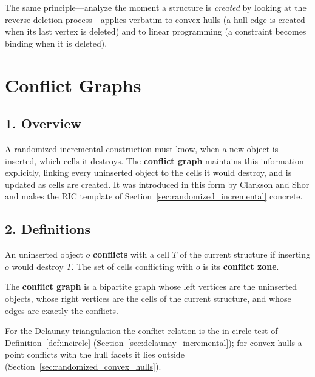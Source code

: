 \begin{remark}
  The same principle---analyze the moment a structure is \emph{created} by
  looking at the reverse deletion process---applies verbatim to convex hulls (a
  hull edge is created when its last vertex is deleted) and to linear
  programming (a constraint becomes binding when it is deleted).
\end{remark}


\section{Conflict Graphs}
\label{sec:randomized_conflict_graphs}

\subsection{1. Overview}

A randomized incremental construction must know, when a new object is inserted,
which cells it destroys. The \textbf{conflict graph}
maintains this information explicitly, linking every uninserted object to the
cells it would destroy, and is updated as cells are created. It was introduced
in this form by Clarkson and Shor \cite{clarkson1989} and makes the RIC
template of Section~\ref{sec:randomized_incremental} concrete.

\subsection{2. Definitions}

\begin{definition}[Conflict]\label{def:rand_conflict}
  An uninserted object $o$ \textbf{conflicts} with a cell $T$ of the current
  structure if inserting $o$ would destroy $T$. The set of cells conflicting
  with $o$ is its \textbf{conflict zone}.
\end{definition}

\begin{definition}\label{def:rand_conflict_graph}
  The \textbf{conflict graph} is a bipartite graph whose left vertices are the
  uninserted objects, whose right vertices are the cells of the current
  structure, and whose edges are exactly the conflicts.
\end{definition}

For the Delaunay triangulation the conflict relation is the in-circle test of
Definition~\ref{def:incircle} (Section~\ref{sec:delaunay_incremental}); for
convex hulls a point conflicts with the hull facets it lies outside
(Section~\ref{sec:randomized_convex_hulls}).


